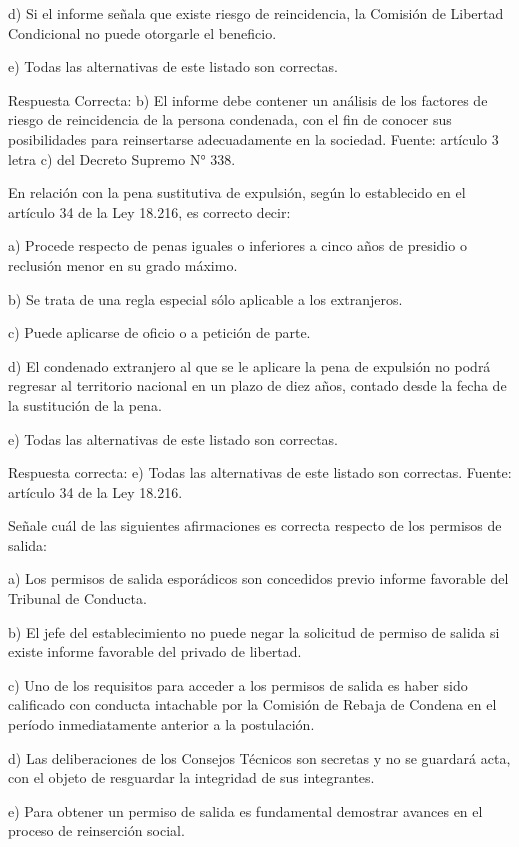 \documentclass[letterpaper, 11pt]{article}
\begin{document}
d) Si el informe señala que existe riesgo de reincidencia, la Comisión de Libertad Condicional
no puede otorgarle el beneficio.

e) Todas las alternativas de este listado son correctas.

Respuesta Correcta:
b) El informe debe contener un análisis de los factores de riesgo de
reincidencia de la persona condenada, con el fin de conocer sus posibilidades para
reinsertarse adecuadamente en la sociedad.
Fuente: artículo 3 letra c) del Decreto Supremo N° 338.

En relación con la pena sustitutiva de expulsión, según lo establecido en el artículo 34
de la Ley 18.216, es correcto decir:

a) Procede respecto de penas iguales o inferiores a cinco años de presidio o reclusión menor
en su grado máximo.

b) Se trata de una regla especial sólo aplicable a los extranjeros.

c) Puede aplicarse de oficio o a petición de parte.

d) El condenado extranjero al que se le aplicare la pena de expulsión no podrá regresar al
territorio nacional en un plazo de diez años, contado desde la fecha de la sustitución de la
pena.

e) Todas las alternativas de este listado son correctas.

Respuesta correcta:
e) Todas las alternativas de este listado son correctas.
Fuente: artículo 34 de la Ley 18.216.

Señale cuál de las siguientes afirmaciones es correcta respecto de los permisos de
salida:

a) Los permisos de salida esporádicos son concedidos previo informe favorable del Tribunal
de Conducta.

b) El jefe del establecimiento no puede negar la solicitud de permiso de salida si existe
informe favorable del privado de libertad.

c) Uno de los requisitos para acceder a los permisos de salida es haber sido calificado con
conducta intachable por la Comisión de Rebaja de Condena en el período inmediatamente
anterior a la postulación.

d) Las deliberaciones de los Consejos Técnicos son secretas y no se guardará acta, con el
objeto de resguardar la integridad de sus integrantes.

e) Para obtener un permiso de salida es fundamental demostrar avances en el proceso de
reinserción social.
\end{document}
